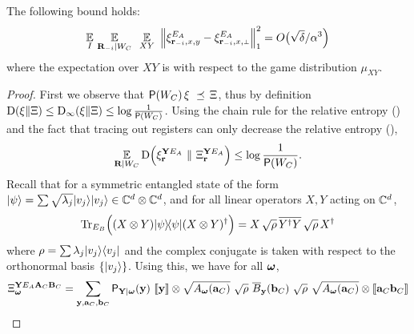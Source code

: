 \begin{claim}\label{claim:xi-change-y}
The following bound holds:
\begin{align}
\label{eq:E_A_1}
\Ex_I \, \Ex_{\bR_\mi |  W_C} \, \, \, \Ex_{XY} \,\, \Big \| \xi^{E_A}_\ssxy - \xi^{E_A}_\ssxp \Big \|_1^2 = O\big(\sqrt{\delta}/\alpha^3 \Big)
\end{align}
where the expectation over $XY$ is with respect to the game distribution $\mu_{XY}$. 
\end{claim}

\begin{proof}
First we observe that $\P(W_C) \, \xi\,\, \preceq \,\Xi$, thus by definition $\D(\xi \| \Xi)\leq \D_\infty(\xi \| \Xi) \leq \log \frac{1}{\P(W_C)}$.  Using the chain rule for the relative entropy () and the fact that tracing out registers can only decrease the relative entropy (), 
\begin{equation}\label{eq:claim23-1}
	\Ex_{\bR | W_C} \D \Big (\xi_{\br}^{\bY E_A} \,\, \| \,\, \Xi_{\br}^{\bY E_A} \Big ) \leq \log \frac{1}{\P(W_C)}.
\end{equation}
Recall that for a symmetric entangled state of the form $\ket{\psi} = \sum \sqrt{\lambda_j} \ket{v_j}\ket{v_j} \in \C^d \otimes \C^d$, and for all linear operators $X,Y$ acting on $\C^d$, 
\[
	\Tr_{E_B} \Big( (X \otimes Y)\ketbra{\psi}{\psi}(X \otimes Y)^\dagger \Big) = X \, \sqrt{\rho} \, \overline{Y^\dagger Y} \, \sqrt{\rho} \, X^\dagger
\]
where $\rho = \sum \lambda_j \ket{v_j}\bra{v_j}$ and the complex conjugate is taken with respect to the orthonormal basis $\{\ket{v_j}\}$. 
	Using this, we have for all $\bomega$,
	\begin{align}
		\Xi_\bomega^{\bY E_A \bA_C \bB_C} &= \sum_{\by, \ba_C, \bb_C} \P_{\bY | \bomega}(\by) \,\, \puretomixed{\by} \otimes \sqrt{A_\bomega(\ba_C)} \,\, \sqrt{\rho} \,\, \overline{B}_{\by}(\bb_C) \,\, \sqrt{\rho} \,\, \sqrt{A_\bomega(\ba_C)}  \otimes \puretomixed{\ba_C \bb_C}\notag \\

\end{align}
\end{proof}
